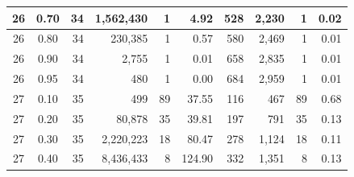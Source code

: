 \begin{table}[H]
\begin{tabular}{|c|c|r|r|r|r|r|r|r|r|}
        26                              & 0.70                               & 34                                              & 1,562,430                                          & 1             & 4.92          & 528           & 2,230            & 1             & 0.02          \\ \hline
        26                              & 0.80                               & 34                                              & 230,385                                            & 1             & 0.57          & 580           & 2,469            & 1             & 0.01          \\ \hline
        26                              & 0.90                               & 34                                              & 2,755                                              & 1             & 0.01          & 658           & 2,835            & 1             & 0.01          \\ \hline
        26                              & 0.95                               & 34                                              & 480                                                & 1             & 0.00          & 684           & 2,959            & 1             & 0.01          \\ \hline
        27                              & 0.10                               & 35                                              & 499                                                & 89            & 37.55         & 116           & 467              & 89            & 0.68          \\ \hline
        27                              & 0.20                               & 35                                              & 80,878                                             & 35            & 39.81         & 197           & 791              & 35            & 0.13          \\ \hline
        27                              & 0.30                               & 35                                              & 2,220,223                                          & 18            & 80.47         & 278           & 1,124            & 18            & 0.11          \\ \hline
        27                              & 0.40                               & 35                                              & 8,436,433                                          & 8             & 124.90        & 332           & 1,351            & 8             & 0.13          \\ \hline

\end{tabular}
\end{table}
